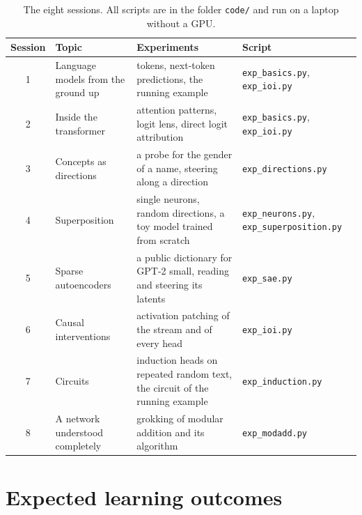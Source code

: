 \documentclass[11pt,a4paper]{article}
\theoremstyle{plain}
\theoremstyle{definition}
\theoremstyle{remark}
\begin{document}
\begin{table}[h]
\centering\small
\begin{tabular}{@{}c>{\raggedright\arraybackslash}p{}>{\raggedright\arraybackslash}p{}>{\raggedright\arraybackslash}p{}@{}}
\toprule
Session & Topic & Experiments & Script \\
\midrule
1 & Language models from the ground up & tokens, next-token predictions, the running example & \texttt{exp\_basics.py}, \texttt{exp\_ioi.py} \\
2 & Inside the transformer & attention patterns, logit lens, direct logit attribution & \texttt{exp\_basics.py}, \texttt{exp\_ioi.py} \\
3 & Concepts as directions & a probe for the gender of a name, steering along a direction & \texttt{exp\_directions.py} \\
4 & Superposition & single neurons, random directions, a toy model trained from scratch & \texttt{exp\_neurons.py}, \texttt{exp\_superposition.py} \\
5 & Sparse autoencoders & a public dictionary for GPT-2 small, reading and steering its latents & \texttt{exp\_sae.py} \\
6 & Causal interventions & activation patching of the stream and of every head & \texttt{exp\_ioi.py} \\
7 & Circuits & induction heads on repeated random text, the circuit of the running example & \texttt{exp\_induction.py} \\
8 & A network understood completely & grokking of modular addition and its algorithm & \texttt{exp\_modadd.py} \\
\bottomrule
\end{tabular}
\caption{The eight sessions. All scripts are in the folder \texttt{code/} and run on a laptop without a GPU.}
\label{tab:plan}
\end{table}

\section*{Expected learning outcomes}
\end{document}
